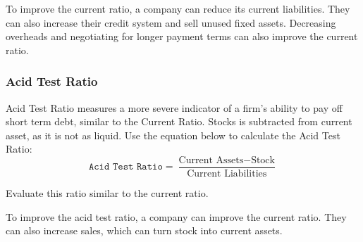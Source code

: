 \documentclass{standalone}
\begin{document}
To improve the current ratio, a company can reduce its current liabilities.
They can also increase their credit system and sell unused fixed assets.
Decreasing overheads and negotiating for longer payment terms can also improve the current ratio.

\subsubsection{Acid Test Ratio}
Acid Test Ratio measures a more severe indicator of a firm's ability to pay off short term debt, similar to the Current Ratio.
Stocks is subtracted from current asset, as it is not as liquid.
Use the equation below to calculate the Acid Test Ratio:
\begin{equation}
    \texttt{Acid Test Ratio} = \frac{\textrm{Current Assets} - \textrm{Stock}}{\textrm{Current Liabilities}}
\end{equation}

Evaluate this ratio similar to the current ratio.

To improve the acid test ratio, a company can improve the current ratio.
They can also increase sales, which can turn stock into current assets.
\end{document}
